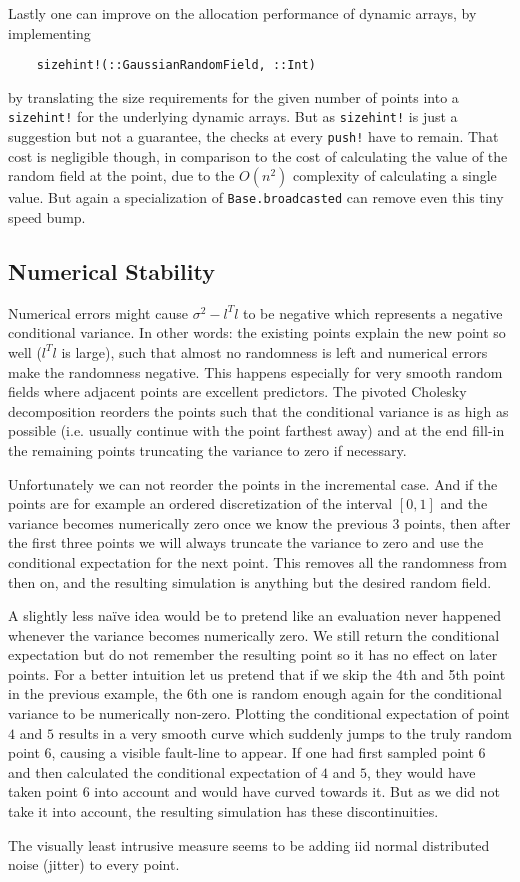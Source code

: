 Lastly one can improve on the allocation performance of dynamic arrays, by implementing
\begin{verbatim}
	sizehint!(::GaussianRandomField, ::Int)	
\end{verbatim}
by translating the size requirements for the given number of points into a
\texttt{sizehint!} for the underlying dynamic arrays. But as
\texttt{sizehint!} is just a suggestion but not a guarantee, the
checks at every \texttt{push!} have to remain. That
cost is negligible though, in comparison to the cost of calculating the
value of the random field at the point, due to the \(O(n^2)\) complexity of
calculating a single value. But again a specialization of
\texttt{Base.broadcasted} can remove even this tiny speed bump.

\subsection{Numerical Stability}

Numerical errors might cause \(\sigma^2 - l^T l\) to be negative which
represents a negative conditional variance. In other words: the existing points
explain the new point so well (\(l^Tl\) is large), such that almost no
randomness is left and numerical errors make the randomness negative. This
happens especially for very smooth random fields where adjacent points are
excellent predictors. The pivoted Cholesky decomposition reorders the points
such that the conditional variance is as high as possible (i.e. usually continue
with the point farthest away) and at the end fill-in the remaining points
truncating the variance to zero if necessary.

Unfortunately we can not reorder the points in the incremental case. And if the
points are for example an ordered discretization of the interval \([0,1]\) and
the variance becomes numerically zero once we know the previous \(3\) points,
then after the first three points we will always truncate the variance to zero
and use the conditional expectation for the next point. This removes all the
randomness from then on, and the resulting simulation is anything but the desired
random field.

A slightly less naïve idea would be to pretend like an evaluation never happened
whenever the variance becomes numerically zero. We still return the conditional
expectation but do not remember the resulting point so it has no effect on later
points. For a better intuition let us pretend that if we skip the 4th and 5th point
in the previous example, the 6th one is random enough again for the conditional
variance to be numerically non-zero. Plotting the conditional expectation of
point \(4\) and \(5\) results in a very smooth curve which suddenly jumps
to the truly random point \(6\), causing a visible fault-line to appear. If one
had first sampled point \(6\) and then calculated the conditional expectation
of \(4\) and \(5\), they would have taken point \(6\) into account and would
have curved towards it. But as we did not take it into account, the resulting
simulation has these discontinuities.

The visually least intrusive measure seems to be adding iid normal distributed
noise (jitter) to every point. 


